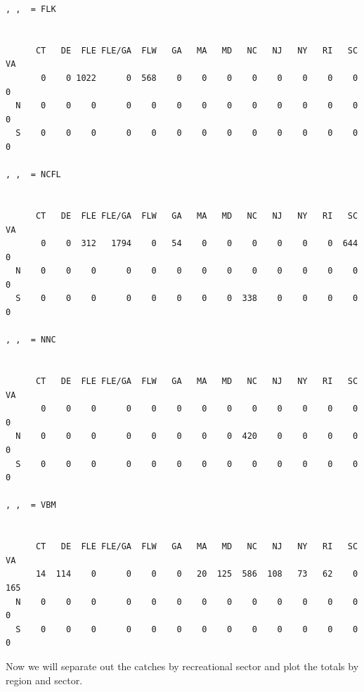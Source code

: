 \documentclass[
  letterpaper,
  oneside,
  open=any]{scrbook}
\newenvironment{Shaded}{\begin{snugshade}}{\end{snugshade}}
\newcommand{\AttributeTok}[1]{\textcolor[rgb]{0.40,0.45,0.13}{#1}}
\newcommand{\CommentTok}[1]{\textcolor[rgb]{0.37,0.37,0.37}{#1}}
\newcommand{\FunctionTok}[1]{\textcolor[rgb]{0.28,0.35,0.67}{#1}}
\newcommand{\NormalTok}[1]{\textcolor[rgb]{0.00,0.23,0.31}{#1}}
\newcommand{\OtherTok}[1]{\textcolor[rgb]{0.00,0.23,0.31}{#1}}
\newcommand{\SpecialCharTok}[1]{\textcolor[rgb]{0.37,0.37,0.37}{#1}}
\newcommand{\StringTok}[1]{\textcolor[rgb]{0.13,0.47,0.30}{#1}}
\begin{document}
\begin{verbatim}
, ,  = FLK

   
      CT   DE  FLE FLE/GA  FLW   GA   MA   MD   NC   NJ   NY   RI   SC   VA
       0    0 1022      0  568    0    0    0    0    0    0    0    0    0
  N    0    0    0      0    0    0    0    0    0    0    0    0    0    0
  S    0    0    0      0    0    0    0    0    0    0    0    0    0    0

, ,  = NCFL

   
      CT   DE  FLE FLE/GA  FLW   GA   MA   MD   NC   NJ   NY   RI   SC   VA
       0    0  312   1794    0   54    0    0    0    0    0    0  644    0
  N    0    0    0      0    0    0    0    0    0    0    0    0    0    0
  S    0    0    0      0    0    0    0    0  338    0    0    0    0    0

, ,  = NNC

   
      CT   DE  FLE FLE/GA  FLW   GA   MA   MD   NC   NJ   NY   RI   SC   VA
       0    0    0      0    0    0    0    0    0    0    0    0    0    0
  N    0    0    0      0    0    0    0    0  420    0    0    0    0    0
  S    0    0    0      0    0    0    0    0    0    0    0    0    0    0

, ,  = VBM

   
      CT   DE  FLE FLE/GA  FLW   GA   MA   MD   NC   NJ   NY   RI   SC   VA
      14  114    0      0    0    0   20  125  586  108   73   62    0  165
  N    0    0    0      0    0    0    0    0    0    0    0    0    0    0
  S    0    0    0      0    0    0    0    0    0    0    0    0    0    0
\end{verbatim}

Now we will separate out the catches by recreational sector and plot the
totals by region and sector.

\begin{Shaded}
\end{Shaded}
\end{document}
